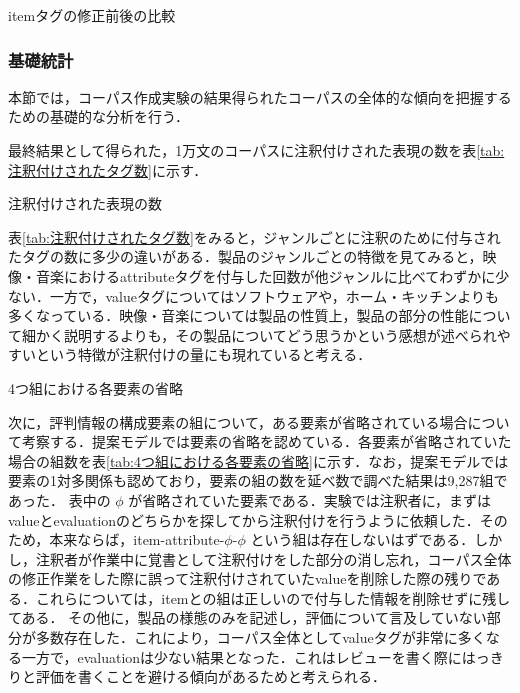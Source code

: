 \documentclass[japanese]{jnlp_1.4}
\begin{document}
\begin{table}[b]
\caption{itemタグの修正前後の比較}
\label{tab:itemタグの修正前後の比較}

\end{table}



\subsubsection{基礎統計}
\label{sec:基礎統計}

本節では，コーパス作成実験の結果得られたコーパスの全体的な傾向を把握するための基礎的な分析を行う．

最終結果として得られた，1万文のコーパスに注釈付けされた表現の数を表\ref{tab:注釈付けされたタグ数}に示す．

\begin{table}[b]
\caption{注釈付けされた表現の数}
\label{tab:注釈付けされたタグ数}

\end{table}

表\ref{tab:注釈付けされたタグ数}をみると，ジャンルごとに注釈のために付与されたタグの数に多少の違いがある．製品のジャンルごとの特徴を見てみると，映像・音楽におけるattributeタグを付与した回数が他ジャンルに比べてわずかに少ない．一方で，valueタグについてはソフトウェアや，ホーム・キッチンよりも多くなっている．映像・音楽については製品の性質上，製品の部分の性能について細かく説明するよりも，その製品についてどう思うかという感想が述べられやすいという特徴が注釈付けの量にも現れていると考える．

\begin{table}[b]
\caption{4つ組における各要素の省略}
\label{tab:4つ組における各要素の省略}

\end{table}

次に，評判情報の構成要素の組について，ある要素が省略されている場合について考察する．提案モデルでは要素の省略を認めている．各要素が省略されていた場合の組数を表\ref{tab:4つ組における各要素の省略}に示す．なお，提案モデルでは要素の1対多関係も認めており，要素の組の数を延べ数で調べた結果は9,287組であった．
表中の $\phi$ が省略されていた要素である．実験では注釈者に，まずはvalueとevaluationのどちらかを探してから注釈付けを行うように依頼した．そのため，本来ならば，item-attribute-$\phi$-$\phi$ という組は存在しないはずである．しかし，注釈者が作業中に覚書として注釈付けをした部分の消し忘れ，コーパス全体の修正作業をした際に誤って注釈付けされていたvalueを削除した際の残りである．これらについては，itemとの組は正しいので付与した情報を削除せずに残してある．
その他に，製品の様態のみを記述し，評価について言及していない部分が多数存在した．これにより，コーパス全体としてvalueタグが非常に多くなる一方で，evaluationは少ない結果となった．これはレビューを書く際にはっきりと評価を書くことを避ける傾向があるためと考えられる．
\end{document}
